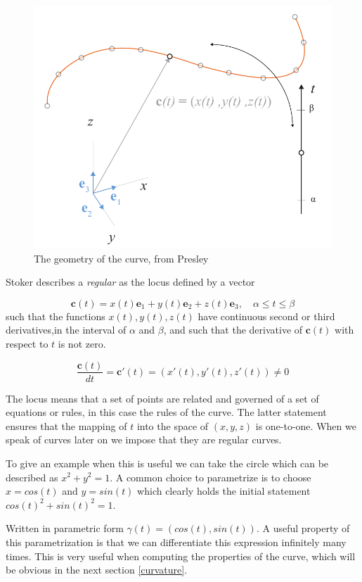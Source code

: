 \begin{figure}[H]
\centering
\includegraphics[width=0.7\linewidth ]{figure/Theory/CurveInSpace.pdf}              
\caption{The geometry of the curve, from Presley }
\end{figure}

Stoker describes a \textit{regular} as the locus defined by a vector

\begin{equation}
\textbf{c}(t) = x(t)\textbf{e}_1 +  y(t)\textbf{e}_2+  z(t)\textbf{e}_3,\quad  \alpha \leq t \leq \beta
\end{equation}
 such that the functions  $x(t), y(t), z(t)$ have continuous second or third derivatives,in the interval of $\alpha$ and $\beta$, and such that the derivative of $\textbf{c}(t)$ with respect to $t$ is not zero.
 
 \begin{equation}
 \frac{\textbf{c}(t)}{dt} = \textbf{c}'(t)= (x'(t),y'(t),z'(t)) \neq 0
 \end{equation}

The locus means that a set of points are related and governed of a set of equations or rules, in this case the rules of the curve. The latter statement ensures that the mapping of $t$ into the space of $(x,y,z)$ is one-to-one. When we speak of curves later on we impose that they are regular curves.

\vspace{5mm} %

To give an example when this is useful we can take the circle which can be described as $x^2+y^2=1$. A common choice to parametrize is to choose $x = cos(t)$ and $y = sin(t)$ which clearly holds the initial statement $cos(t)^2 + sin(t)^2 = 1$.  

Written in parametric form $\gamma(t) = (cos(t),sin(t))$. A useful property of this parametrization is that we can differentiate this expression infinitely many times. This is very useful when computing the properties of the curve, which will be obvious in the next section \ref{curvature}.

